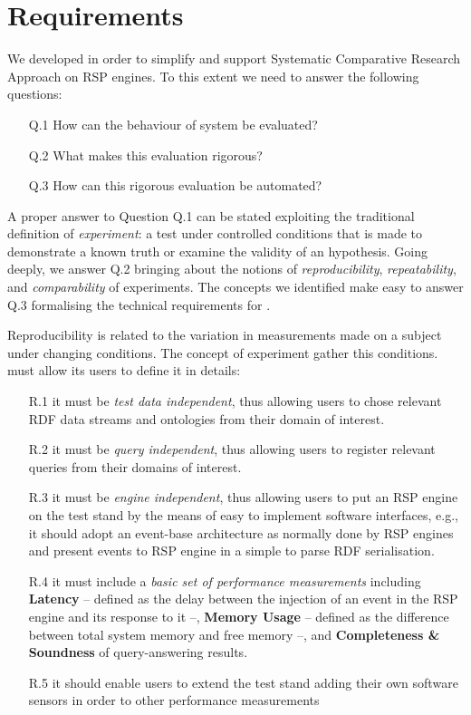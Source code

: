 \section{Requirements} \label{sec:requirements}

We developed \name in order to simplify and support Systematic Comparative Research Approach on RSP engines. To this extent we need to answer the following questions: 
\begin{enumerate}
\item[Q.1] How can the behaviour of system be evaluated? 
\item[Q.2] What makes this evaluation rigorous? 
\item[Q.3] How can this rigorous evaluation be automated?
\end{enumerate}

A proper answer to Question Q.1 can be stated exploiting the traditional definition of \textit{experiment}: a test under controlled conditions that is made to demonstrate a known truth or examine the validity of an hypothesis. Going deeply, we answer Q.2 bringing about the notions of \textit{reproducibility}, \textit{repeatability}, and \textit{comparability} of experiments. The concepts we identified make easy to answer Q.3 formalising the technical requirements for \namens.

Reproducibility is related to the variation in measurements made on a subject under changing conditions. The concept of experiment gather this conditions. \name must allow its users to define it in details: 
\begin{enumerate}
\item[R.1] it must be \textit{test data independent}, thus allowing users to chose relevant RDF data streams and ontologies from their domain of interest. %
\item[R.2] it must be \textit{query independent}, thus allowing users to register relevant queries from their domains of interest. %
\item[R.3] it must be \textit{engine independent}, thus allowing users to put an RSP engine on the test stand by the means of easy to implement software interfaces, e.g., it should adopt an event-base architecture as normally done by RSP engines and present events to RSP engine in a simple to parse RDF serialisation. %
\item[R.4] it must include a \textit{basic set of performance measurements} \cite{DBLP:conf/esws/ScharrenbachUMVB13} including \textbf{Latency} -- defined as the delay between the injection of an event in the RSP engine and its response to it --, \textbf{Memory Usage} -- defined as the difference between total system memory and free memory --, and \textbf{Completeness \& Soundness} of query-answering results.  %
\item[R.5] it should enable users to extend the test stand adding their own software sensors in order to other performance measurements %
\end{enumerate}

